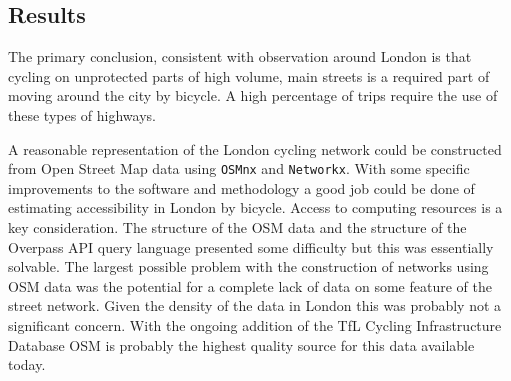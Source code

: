 

%


\subsection{Results}	

The primary conclusion, consistent with observation around London is that cycling on unprotected parts of high volume, main streets is a required part of moving around the city by bicycle. A high percentage of trips require the use of these types of highways. 

A reasonable representation of the London cycling network could be constructed from Open Street Map data using \texttt{OSMnx} and \texttt{Networkx}. With some specific improvements to the software and methodology a good job could be done of estimating accessibility in London by bicycle. Access to computing resources is a key consideration. The structure of the OSM data and the structure of the Overpass API query language presented some difficulty but this was essentially solvable. The largest possible problem with the construction of networks using OSM data was the potential for a complete lack of data on some feature of the street network. Given the density of the data in London this was probably not a significant concern. With the ongoing addition of the TfL Cycling Infrastructure Database OSM is probably the highest quality source for this data available today. 

